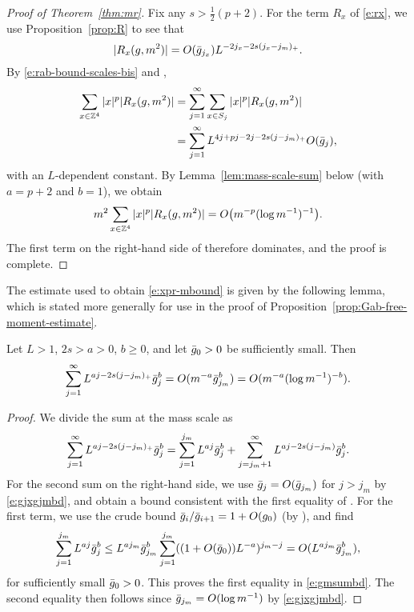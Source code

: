\begin{proof}[Proof of Theorem~\ref{thm:mr}]
Fix any $s>\frac 12 (p+2)$.
For the term $R_x$ of \eqref{e:rx}, we use Proposition~\ref{prop:R}
to see that
\begin{equation}\label{e:rab-bound-scales-bis}
|R_x(g, m^2)|
=
O(\bar{g}_{j_x})
L^{-2j_x - 2s (j_x - j_m)_+}.
\end{equation}
By \eqref{e:rab-bound-scales-bis} and ,
\begin{equation} \label{e:xpr-shells}
\begin{aligned}
    \sum_{x\in{\mathbb Z}^4} |x|^p |R_{x}(g,m^2)|
    &= \sum_{j = 1}^\infty\sum_{x\in S_j}   |x|^p |R_{x}(g,m^2)|
    \\
    &= \sum_{j = 1}^\infty
    L^{4j + pj - 2j - 2s (j - j_m)_+} O(\bar{g}_{j})
    ,
\end{aligned}
\end{equation}
with an $L$-dependent constant.
By Lemma~\ref{lem:mass-scale-sum} below (with $a=p+2$ and $b=1$),
we obtain
\begin{equation}\label{e:xpr-mbound}
    m^2 \sum_{x\in{\mathbb Z}^4} |x|^p |R_{x}(g,m^2)|
    = O\big( m^{-p}(\log m^{-1})^{-1}\big).
\end{equation}
The first term on the right-hand side of  therefore dominates,
and the proof is complete.
\end{proof}

The estimate used to obtain \eqref{e:xpr-mbound}
is given by the following lemma,
which is stated more generally for use
in the proof of Proposition~\ref{prop:Gab-free-moment-estimate}.

\begin{lemma} \label{lem:mass-scale-sum}
Let $L>1$, $2s> a > 0$, $b \geq 0$, and let $\bar{g}_0>0$ be sufficiently small.
Then
\begin{equation} \label{e:gmsumbd}
\sum_{j=1}^\infty L^{aj - 2s (j - j_m)_+}
\bar{g}_j^b = O(m^{-a} \bar{g}_{j_m}^b) = O(m^{-a} (\log m^{-1})^{-b}).
\end{equation}
\end{lemma}

\begin{proof}
We divide the sum at the mass scale as
\begin{equation} \label{e:xpr-2sums}
\sum_{j=1}^\infty L^{aj - 2s (j - j_m)_+} \bar{g}_j^{b}
= \sum_{j=1}^{j_m} L^{aj} \bar{g}_j^{b} +  \sum_{j=j_m+1}^\infty L^{aj - 2s (j - j_m)} \bar{g}_{j}^{b}.
\end{equation}
For the second sum on the right-hand side, we use $\bar{g}_j = O(\bar{g}_{j_m})$ for $j > j_m$
by \eqref{e:gjxgjmbd},
and obtain
a bound consistent with the first equality of .
For the first term, we use the crude bound
$\bar{g}_i/\bar{g}_{i+1} = 1+O(g_0)$ (by
\cite[Lemma~\ref{flow-lem:elementary-recursion}]{BBS-rg-flow}), and find
\begin{equation}
  \sum_{j=1}^{j_m} L^{aj} \bar{g}_j^b
  \leq
  L^{aj_m} \bar{g}_{j_m}^b
  \sum_{j=1}^{j_m} ((1+O(\bar{g}_0))L^{-a})^{j_m-j}
  =
  O(L^{aj_m} \bar{g}_{j_m}^b),
\end{equation}
for sufficiently small $\bar{g}_0>0$.
This proves the first equality in \eqref{e:gmsumbd}.
The second equality then follows since
$\bar{g}_{j_m} = O(\log m^{-1})$ by \eqref{e:gjxgjmbd}.
\end{proof}